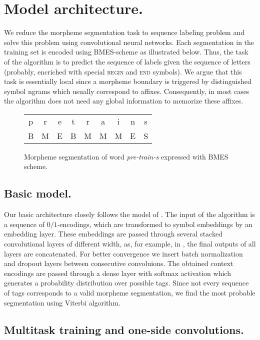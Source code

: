 \documentclass[11pt,a4paper]{article}
\begin{document}
\section{Model architecture.}

We reduce the morpheme segmentation task to sequence labeling problem and solve this problem using convolutional neural networks. Each segmentation in the training set is encoded using BMES-scheme as illustrated below. Thus, the task of the algorithm is to predict the sequence of labels given the sequence of letters (probably, encriched with special \textsc{begin} and \textsc{end} symbols). We argue that this task is essentially local since a morpheme boundary is triggered by distinguished symbol ngrams which usually correspond to affixes. Consequently, in most cases the algorithm does not need any global information to memorize these affixes.

\begin{figure}
	\begin{center}
		\begin{tabular}{ccccccccc}
			p & r & e & t & r & a & i & n & s \\
			B & M & E & B & M & M & M & E & S
		\end{tabular}
	\end{center}
	\caption{Morpheme segmentation of word \textit{pre-train-s} expressed with BMES scheme.}
\end{figure}


\subsection{Basic model.}

Our basic architecture closely follows the model of . The input of the algorithm is a sequence of $0/1$-encodings, which are transformed to symbol embeddings by an embedding layer. These embeddings are passed through several stacked convolutional layers of different width, as, for example, in , the final outputs of all layers are concatenated. For better convergence we insert batch normalization and dropout layers between consecutive convoluions. The obtained context encodings are passed through a dense layer with softmax activation which generates a probability distribution over possible tags. Since not every sequence of tags corresponds to a valid morpheme segmentation, we find the most probable segmentation using Viterbi algorithm. 

\subsection{Multitask training and one-side convolutions.}
\end{document}
